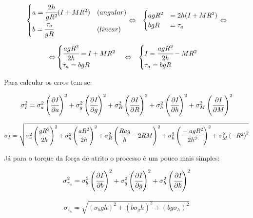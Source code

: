 \documentclass[a4paper]{article}
\begin{document}
\begin{eqnarray*}
\begin{cases}
a=\cfrac{2h}{gR^{2}}(I+MR^{2}) & (angular)\\
b=\cfrac{\tau_{a}}{gR} & (linear)
\end{cases} & \Leftrightarrow & \begin{cases}
agR^{2} & =2h(I+MR^{2})\\
bgR & =\tau_{a}
\end{cases}\Leftrightarrow
\end{eqnarray*}


\begin{eqnarray*}
\Leftrightarrow & \begin{cases}
\cfrac[r]{agR^{2}}{2h}=I+MR^{2}\\
\tau_{a}=bgR
\end{cases}\Leftrightarrow & \begin{cases}
I=\cfrac[r]{agR^{2}}{2h}-MR^{2}\\
\tau_{a}=bgR
\end{cases}
\end{eqnarray*}


Para calcular os erros tem-se:

$$ \sigma_{I}^{2}=\sigma_{a}^{2}\left(\cfrac[r]{\partial I}{\partial a}\right)^{2}+\sigma_{g}^{2}\left(\cfrac[r]{\partial I}{\partial g}\right)^{2}+\sigma_{R}^{2}\left(\cfrac{\partial I}{\partial R}\right)^{2}+\sigma_{h}^{2}\left(\cfrac[r]{\partial I}{\partial h}\right)^{2}+\sigma_{M}^{2}\left(\cfrac{\partial I}{\partial M}\right)^{2} $$

\begin{align}
\sigma_{I}=\sqrt{\sigma_{a}^{2}\left(\cfrac[r]{gR^{2}}{2h}\right)^{2}+\sigma_{g}^{2}\left(\cfrac[r]{aR^{2}}{2h}\right)^{2}+\sigma_{R}^{2}\left(\cfrac{Rag}{h}-2RM\right)^{2}+\sigma_{h}^{2}\left(\cfrac[r]{-agR^{2}}{2h^{2}}\right)^{2}+\sigma_{M}^{2}\left(-R^{2}\right)^{2}}\end{align}

Já para o torque da força de atrito o processo é um pouco mais simples:


$$\sigma_{\tau_{a}}^{2}=\sigma_{b}^{2}\left(\cfrac[r]{\partial I}{\partial b}\right)^{2}+\sigma_{g}^{2}\left(\cfrac[r]{\partial I}{\partial g}\right)^{2}+\sigma_{h}^{2}\left(\cfrac[r]{\partial I}{\partial h}\right)^{2}$$

\begin{align}
\sigma_{\tau_{a}}=\sqrt{(\sigma_{b}gh)^{2}+(b\sigma_{g}h)^{2}+(bg\sigma_{h})^{2}}
\end{align}
\end{document}
